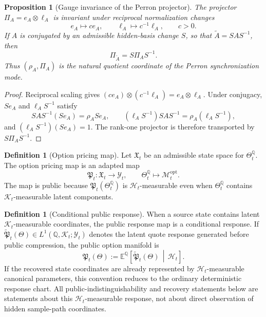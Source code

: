 \documentclass[11pt,a4paper]{amsart}
\theoremstyle{plain}
\newtheorem{proposition}[theorem]{Proposition}
\theoremstyle{definition}
\newtheorem{definition}[theorem]{Definition}
\theoremstyle{remark}
\newcommand{\QQ}{\mathbb{Q}}
\newcommand{\EE}{\mathbb{E}}
\newcommand{\cH}{\mathcal{H}}
\newcommand{\cK}{\mathcal{K}}
\newcommand{\cM}{\mathcal{M}}
\newcommand{\cY}{\mathcal{Y}}
\begin{document}
\begin{proposition}[Gauge invariance of the Perron projector]\label{prop:perron-projector-gauge}
The projector \(\Pi_A=e_A\otimes\ell_A\) is invariant under reciprocal normalization changes
\[
        e_A\mapsto c e_A,\qquad \ell_A\mapsto c^{-1}\ell_A,\qquad c>0.
\]
If \(A\) is conjugated by an admissible hidden-basis change \(S\), so that
\(\widetilde A=SAS^{-1}\), then
\[
        \Pi_{\widetilde A}=S\Pi_A S^{-1}.
\]
Thus \((\rho_A,\Pi_A)\) is the natural quotient coordinate of the Perron synchronization mode.
\end{proposition}

\begin{proof}
Reciprocal scaling gives \((ce_A)\otimes(c^{-1}\ell_A)=e_A\otimes\ell_A\).  Under conjugacy,
\(Se_A\) and \(\ell_A S^{-1}\) satisfy
\[
        SAS^{-1}(Se_A)=\rho_A Se_A,
        \qquad
        (\ell_A S^{-1})SAS^{-1}=\rho_A(\ell_A S^{-1}),
\]
and \((\ell_A S^{-1})(Se_A)=1\).  The rank-one projector is therefore transported by
\(S\Pi_A S^{-1}\).
\end{proof}

\begin{definition}[Option pricing map]\label{def:pricing-map}
Let \(\mathfrak X_t\) be an admissible state space for \(\Theta_t^\QQ\).  The option pricing map is
an adapted map
\[
        \mathfrak P_t:\mathfrak X_t\to\cY_t,
        \qquad
        \Theta_t^\QQ\mapsto \cM_t^{\mathrm{opt}}.
\]
The map is public because \(\mathfrak P_t(\Theta_t^\QQ)\) is \(\cH_t\)-measurable even when
\(\Theta_t^\QQ\) contains \(\cK_t\)-measurable latent components.
\end{definition}

\begin{definition}[Conditional public response]\label{def:conditional-public-response}
When a source state contains latent \(\cK_t\)-measurable coordinates, the public response map
is a conditional response.  If
\(\widetilde{\mathfrak P}_t(\Theta)\in L^1(\QQ,\cK_t;\cY_t)\) denotes the latent quote response
generated before public compression, the public option manifold is
\[
        \mathfrak P_t(\Theta)
        :=
        \EE^\QQ\!\left[
        \widetilde{\mathfrak P}_t(\Theta)
        \,\middle|\,\cH_t
        \right].
\]
If the recovered state coordinates are already represented by \(\cH_t\)-measurable canonical
parameters, this convention reduces to the ordinary deterministic response chart.  All
public-indistinguishability and recovery statements below are statements about this
\(\cH_t\)-measurable response, not about direct observation of hidden sample-path coordinates.
\end{definition}
\end{document}
